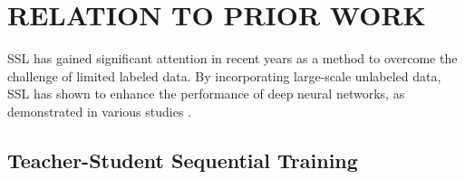 \documentclass{article}
\begin{document}
\section{RELATION TO PRIOR WORK}
\label{sec:related-works}

SSL has gained significant attention in recent years as a method to overcome the challenge of limited labeled data.
By incorporating large-scale unlabeled data, SSL has shown to enhance the performance of deep neural networks, as demonstrated in various studies \cite{KS20a,QX20a,DB19a,BZ21a,WC22a}.



\subsection{Teacher-Student Sequential Training}
\label{subsec:KD}
\end{document}
